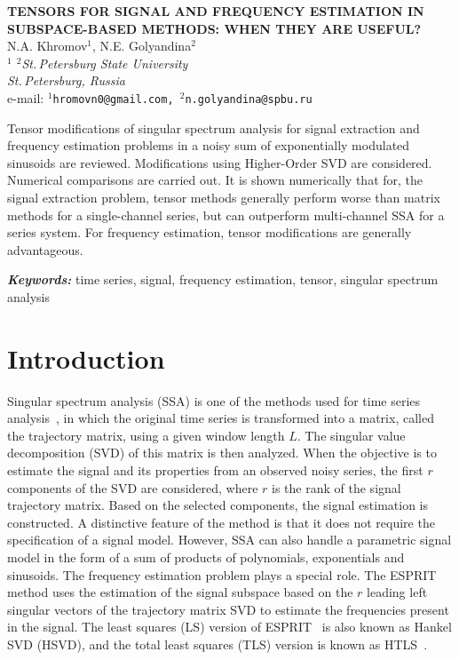 \documentclass[12pt]{article}
\providecommand{\keywords}[1]
{
  \vspace{2mm}\hspace{20pt}\textbf{\textit{Keywords:}} #1
}
\providecommand{\abskeyw}[2]
{
  \begin{small}
    \begin{adjustwidth}{10mm}{10mm}
      \vspace{1mm}\hspace{20pt}#1

      \keywords{#2}
    \end{adjustwidth}
  \end{small}
}
\theoremstyle{definition}
\begin{document}
\begin{center}
  {\Large\bf TENSORS FOR SIGNAL AND FREQUENCY ESTIMATION IN
  SUBSPACE-BASED METHODS: WHEN THEY ARE USEFUL?}\\\vspace{2mm} {\sc N.A.
  Khromov$^1$, N.E. Golyandina$^2$}\\\vspace{2mm}
  {\it $^{1}$ $^{2}$St.\,Petersburg State University\\
  St.\,Petersburg, Russia\\} e-mail: {\tt $^1$hromovn0@gmail.com,
  $^2$n.golyandina@spbu.ru}

  \abskeyw{Tensor modifications of singular spectrum analysis for
    signal extraction and frequency estimation problems in a noisy sum
    of exponentially modulated sinusoids are reviewed. Modifications
    using Higher-Order SVD are considered. Numerical comparisons are
    carried out. It is shown numerically that for, the signal
    extraction problem, tensor methods generally perform worse than
    matrix methods for a single-channel series, but can outperform
    multi-channel SSA for a series system. For frequency estimation,
  tensor modifications are generally advantageous.}{time series,
  signal, frequency estimation, tensor, singular spectrum analysis}
\end{center}

\section{Introduction}

Singular spectrum analysis (SSA) is one of the methods used for time
series analysis~\cite{Golyandina2001}, in which the original time
series is transformed into a matrix, called the trajectory matrix,
using a given window length $L$. The singular value decomposition
(SVD) of this matrix is then analyzed. When the objective is to
estimate the signal and its properties from an observed noisy series,
the first $r$ components of the SVD are considered, where $r$ is the
rank of the signal trajectory matrix. Based on the selected
components, the signal estimation is constructed. A distinctive
feature of the method is that it does not require the specification
of a signal model. However, SSA can also handle a parametric signal
model in the form of a sum of products of polynomials, exponentials
and sinusoids. The frequency estimation problem plays a special role.
The ESPRIT method uses the estimation of the signal subspace based on
the $r$ leading left singular vectors of the trajectory matrix SVD to
estimate the frequencies present in the signal.
The least squares (LS) version of ESPRIT~\cite{Roy1989} is also known
as Hankel SVD (HSVD), and the total least squares (TLS) version is
known as HTLS~\cite{VanHuffel1994}.
\end{document}
